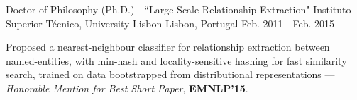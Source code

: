 

\begin{cventries}

  \cventry
    {Doctor of Philosophy (Ph.D.) - ``Large-Scale Relationship Extraction"} %
	{Instituto Superior Técnico, University Lisbon} %
    {Lisbon, Portugal} %
    {Feb. 2011 - Feb. 2015} %
    {
      \begin{cvitems} %
        \item {Proposed a nearest-neighbour classifier for relationship extraction between named-entities, with min-hash and locality-sensitive hashing for fast similarity search, trained on data bootstrapped from distributional representations --- {\it Honorable Mention for Best Short Paper}, \textbf{EMNLP'15}.}
      \end{cvitems}
    }



\end{cventries}
